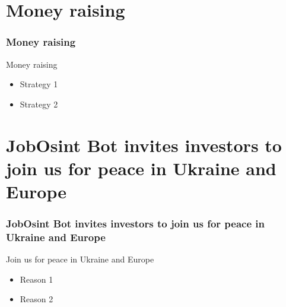 \documentclass{beamer}
\begin{document}
\section{Money raising}

\begin{frame}
    \frametitle{Money raising}
    
    \begin{block}{Money raising}
        \begin{itemize}
            \item Strategy 1
            \item Strategy 2
        \end{itemize}
    \end{block}
    
\end{frame}

\section{JobOsint Bot invites investors to join us for peace in Ukraine and Europe}

\begin{frame}
    \frametitle{JobOsint Bot invites investors to join us for peace in Ukraine and Europe}
    
    \begin{block}{Join us for peace in Ukraine and Europe}
        \begin{itemize}
            \item Reason 1
            \item Reason 2
        \end{itemize}
    \end{block}
    
\end{frame}
\end{document}
